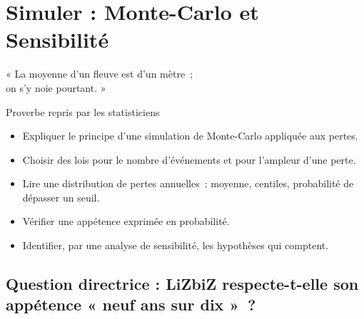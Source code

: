 
\chapter{Simuler : Monte-Carlo et Sensibilité}
\label{chap:simulation}

\epigraph{%
    « La moyenne d'un fleuve est d'un mètre~;\\
    on s'y noie pourtant. »%
}{Proverbe repris par les statisticiens}


\begin{boxobjectifs}
\begin{itemize}
    \item Expliquer le principe d'une simulation de Monte-Carlo appliquée
          aux pertes.
    \item Choisir des lois pour le nombre d'événements et pour l'ampleur
          d'une perte.
    \item Lire une distribution de pertes annuelles~: moyenne, centiles,
          probabilité de dépasser un seuil.
    \item Vérifier une appétence exprimée en probabilité.
    \item Identifier, par une analyse de sensibilité, les hypothèses qui
          comptent.
\end{itemize}
\end{boxobjectifs}

\bigskip

\section*{Question directrice : LiZbiZ respecte-t-elle son appétence « neuf ans sur dix »~?}

